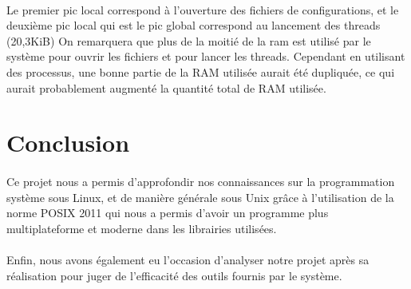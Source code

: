 \documentclass[article, backcover, french, nodocumentinfo]{upmethodology-document}
\begin{document}
					\paragraph*{}
						Le premier pic local correspond à l'ouverture des fichiers de configurations, et le deuxième pic local qui est le pic global correspond au lancement des threads (20,3KiB) On remarquera que plus de la moitié de la ram est utilisé par le système pour ouvrir les fichiers et pour lancer les threads. Cependant en utilisant des processus, une bonne partie de la RAM utilisée aurait été dupliquée, ce qui aurait probablement augmenté la quantité total de RAM utilisée.
	\section*{Conclusion}
		\paragraph*{}
			Ce projet nous a permis d'approfondir nos connaissances sur la programmation système sous Linux, et de manière générale sous Unix grâce à l'utilisation de la norme POSIX 2011 qui nous a permis d'avoir un programme plus multiplateforme et moderne dans les librairies utilisées.
		\paragraph*{}
			Enfin, nous avons également eu l'occasion d'analyser notre projet après sa réalisation pour juger de l'efficacité des outils fournis par le système.
\end{document}
